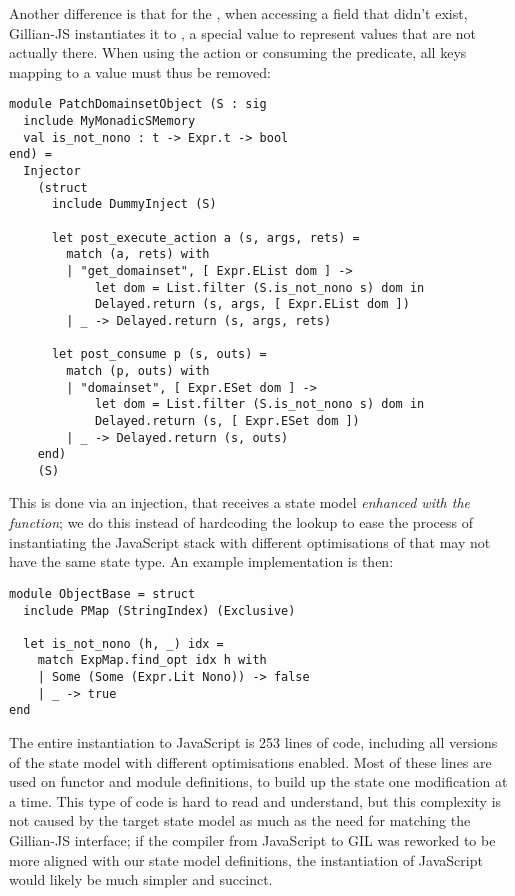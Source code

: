 Another difference is that for the \DynPMap, when accessing a field that didn't exist, Gillian-JS instantiates it to , a special value to represent values that are not actually there. When using the  action or consuming the \domainset{} predicate, all keys mapping to a  value must thus be removed:
\begin{lstlisting}
module PatchDomainsetObject (S : sig
  include MyMonadicSMemory
  val is_not_nono : t -> Expr.t -> bool
end) =
  Injector
    (struct
      include DummyInject (S)

      let post_execute_action a (s, args, rets) =
        match (a, rets) with
        | "get_domainset", [ Expr.EList dom ] ->
            let dom = List.filter (S.is_not_nono s) dom in
            Delayed.return (s, args, [ Expr.EList dom ])
        | _ -> Delayed.return (s, args, rets)

      let post_consume p (s, outs) =
        match (p, outs) with
        | "domainset", [ Expr.ESet dom ] ->
            let dom = List.filter (S.is_not_nono s) dom in
            Delayed.return (s, [ Expr.ESet dom ])
        | _ -> Delayed.return (s, outs)
    end)
    (S)
\end{lstlisting}
This is done via an injection, that receives a state model \emph{enhanced with the  function}; we do this instead of hardcoding the lookup to ease the process of instantiating the JavaScript stack with different optimisations of \PMap{} that may not have the same state type. An example implementation is then:
\begin{lstlisting}
module ObjectBase = struct
  include PMap (StringIndex) (Exclusive)

  let is_not_nono (h, _) idx =
    match ExpMap.find_opt idx h with
    | Some (Some (Expr.Lit Nono)) -> false
    | _ -> true
end
\end{lstlisting}

The entire instantiation to JavaScript is 253 lines of code, including all versions of the state model with different optimisations enabled. Most of these lines are used on functor and module definitions, to build up the state one modification at a time. This type of code is hard to read and understand, but this complexity is not caused by the target state model as much as the need for matching the Gillian-JS interface; if the compiler from JavaScript to GIL was reworked to be more aligned with our state model definitions, the instantiation of JavaScript would likely be much simpler and succinct.

